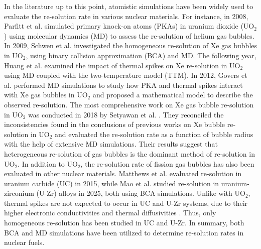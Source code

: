 \documentclass[review]{elsarticle}
\begin{document}
In the literature up to this point,
atomistic simulations have been widely used
to evaluate the re-solution rate in various nuclear materials.
For instance, in 2008, Parfitt et al. \cite{parfitt2008}
simulated primary knock-on atoms (PKAs) in uranium dioxide (UO$_2$)
using molecular dynamics (MD) to assess the re-solution of helium gas bubbles.
In 2009, Schwen et al. \cite{schwen2009md} investigated
the homogeneous re-solution of Xe gas bubbles in UO$_2$,
using binary collision approximation (BCA) and MD.
The following year, Huang et al. \cite{huang2010md}
examined the impact of thermal spikes on Xe re-solution in UO$_2$
using MD coupled with the two-temperature model (TTM).
In 2012, Govers et al. \cite{govers2012} performed MD simulations to study
how PKA and thermal spikes interact with Xe gas bubbles in UO$_2$
and proposed a mathematical model to describe the observed re-solution.
The most comprehensive work on Xe gas bubble re-solution in UO$_2$
was conducted in 2018 by Setyawan et al. \cite{setyawan2018}.
They reconciled the inconsistencies found in the conclusions of previous works
on Xe bubble re-solution in UO$_2$
and evaluated the re-solution rate as a function of bubble radius
with the help of extensive MD simulations.
Their results suggest that heterogeneous re-solution of gas bubbles
is the dominant method of re-solution in UO$_2$.
In addition to UO$_2$,
the re-solution rate of fission gas bubbles has also been evaluated
in other nuclear materials.
Matthews et al. \cite{matthews2015} evaluated re-solution
in uranium carbide (UC) in 2015,
while Mao et al. \cite{mao2025} studied re-solution
in uranium-zirconium (U-Zr) alloys in 2025,
both using BCA simulations.
Unlike with UO$_2$,
thermal spikes are not expected to occur in UC and U-Zr systems,
due to their higher electronic conductivities and thermal diffusivities
\cite{ronchi1986, matthews2015, mao2025}.
Thus, only homogeneous re-solution has been studied in UC and U-Zr.
In summary, both BCA and MD simulations have been utilized
to determine re-solution rates in nuclear fuels.
\end{document}
